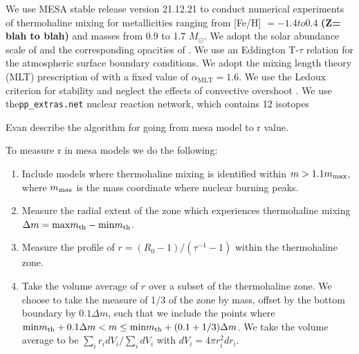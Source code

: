 We use MESA stable release version 21.12.21 to conduct numerical experiments of thermohaline mixing for metallicities ranging from [Fe/H] $= -1.4 to 0.4$ \textbf{(Z= blah to blah)} and masses from 0.9 to 1.7 $M_{\odot}$. We adopt the solar abundance scale of \citet{GrevesseSauval1998} and the corresponding opacities of \citet{IglesiasRogers1996}. We use an Eddington T-$\tau$ relation for the atmospheric surface boundary conditions.
We adopt the mixing length theory (MLT) prescription of \citet{Cox1980} with a fixed value of $\alpha_{\text{MLT}}= 1.6$.  We use the Ledoux criterion for stability and neglect the effects of convective overshoot \citep{Ledoux}. We use the\verb|pp_extras.net| nuclear reaction network, which contains 12 isotopes 



{\color{red} Evan describe the algorithm for going from mesa model to r value}.

To measure r in mesa models we do the following:
\begin{enumerate}
    \item Include models where thermohaline mixing is identified within $m > 1.1 m_{\rm max}$, where $m_{\rm mas}$ is the mass coordinate where nuclear burning peaks.
    \item Measure the radial extent of the zone which experiences thermohaline mixing $\Delta m = \mathrm{max}m_{\rm th} - \mathrm{min}m_{\rm th}$.
    \item Measure the profile of $r = (R_0 - 1)/(\tau^{-1} - 1)$ within the thermohaline zone.
    \item Take the volume average of $r$ over a subset of the thermohaline zone. We choose to take the measure of 1/3 of the zone by mass, offset by the bottom boundary by $0.1\Delta m$, such that we include the points where $\mathrm{min}m_{\rm th} + 0.1\Delta m < m \leq \mathrm{min}m_{\rm th} + (0.1 + 1/3)\Delta m$. We take the volume average to be $\sum_i r_i dV_i / \sum_i dV_i$ with $dV_i = 4\pi r_i^2 dr_i$.
\end{enumerate}